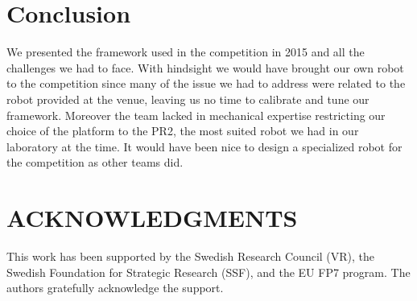 \documentclass[letterpaper, 10pt, conference]{ieeeconf}
\begin{document}












\section{Conclusion}
\label{sec:conclusion}

We presented the framework used in the competition in 2015 and all the challenges we had to face. With hindsight we would have brought our own robot to the competition since many of the issue we had to address were related to the robot provided at the venue, leaving us no time to calibrate and tune our framework. Moreover the team lacked in mechanical expertise restricting our choice of the platform to the PR2, the most suited robot we had in our laboratory at the time. It would have been nice to design a specialized robot for the competition as other teams did.

\section*{ACKNOWLEDGMENTS}

{This work has been supported by the Swedish Research Council (VR), the Swedish Foundation for Strategic Research (SSF), and the EU FP7 program. The authors gratefully acknowledge the support.}



\end{document}
